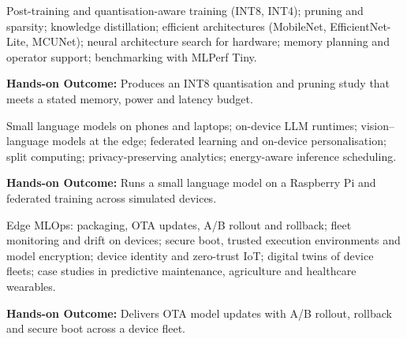 \documentclass[10pt,a4paper]{article}
\begin{document}
\begin{tcolorbox}[unitbox,title={{\color{gold}UNIT III}\quad Model Optimisation for Constrained Devices\hfill{\color{gold}9 Hours}}]\small Post-training and quantisation-aware training (INT8, INT4); pruning and sparsity; knowledge distillation; eﬀicient architectures (MobileNet, EﬀicientNet-Lite, MCUNet); neural architecture search for hardware; memory planning and operator support; benchmarking with MLPerf Tiny.\par\vspace{2pt}\par\textbf{Hands-on Outcome:} Produces an INT8 quantisation and pruning study that meets a stated memory, power and latency budget.\end{tcolorbox}
\begin{tcolorbox}[unitbox,title={{\color{gold}UNIT IV}\quad On-Device Generative AI and Federated Learning\hfill{\color{gold}9 Hours}}]\small Small language models on phones and laptops; on-device LLM runtimes; vision–language models at the edge; federated learning and on-device personalisation; split computing; privacy-preserving analytics; energy-aware inference scheduling.\par\vspace{2pt}\par\textbf{Hands-on Outcome:} Runs a small language model on a Raspberry Pi and federated training across simulated devices.\end{tcolorbox}
\begin{tcolorbox}[unitbox,title={{\color{gold}UNIT V}\quad Edge MLOps, Security and Fleet Management\hfill{\color{gold}9 Hours}}]\small Edge MLOps: packaging, OTA updates, A/B rollout and rollback; fleet monitoring and drift on devices; secure boot, trusted execution environments and model encryption; device identity and zero-trust IoT; digital twins of device fleets; case studies in predictive maintenance, agriculture and healthcare wearables.\par\vspace{2pt}\par\textbf{Hands-on Outcome:} Delivers OTA model updates with A/B rollout, rollback and secure boot across a device fleet.\end{tcolorbox}
\end{document}
